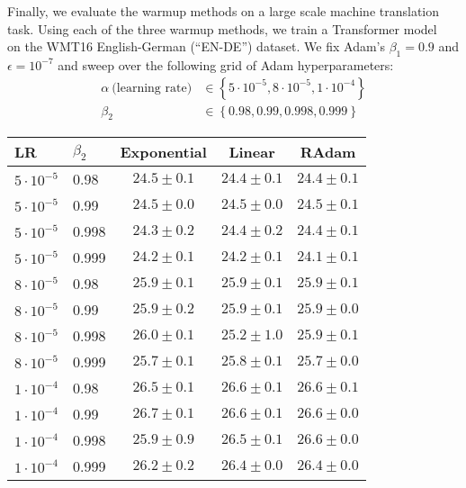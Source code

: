 {Finally, we evaluate the warmup methods on a large scale machine translation task. Using each of the three warmup methods, we train a Transformer model~\citep{vasmani2017transformer} on the WMT16 English-German (``EN-DE'') dataset. We fix Adam's $\beta_1=0.9$ and $\epsilon=10^{-7}$ and sweep over the following grid of Adam hyperparameters:
\begin{align*}
    \alpha~\text{(learning rate)} &\in \left\{ 5 \cdot {10}^{-5}, 8 \cdot {10}^{-5}, 1 \cdot {10}^{-4} \right\} \\
    \beta_2 &\in \left\{ 0.98, 0.99, 0.998, 0.999 \right\}
\end{align*}

\begin{table}[ht]
\centering

\captionsetup{
  justification=centering,
  margin=0.25in
}

\scriptsize

\setlength{\tabcolsep}{3pt}

\begin{tabular}{l l | c c c}
  \toprule
  
  \textbf{LR} & \textbf{$\beta_2$} &          \textbf{Exponential} &               \textbf{Linear} &                \textbf{RAdam} \\
  
  \midrule
  
$5 \cdot {10}^{-5}$ & 0.98& $ 24.5 \pm  0.1 $& $ 24.4 \pm  0.1 $& $ 24.4 \pm  0.1 $\\
$5 \cdot {10}^{-5}$ & 0.99& $ 24.5 \pm  0.0 $& $ 24.5 \pm  0.0 $& $ 24.5 \pm  0.1 $\\
$5 \cdot {10}^{-5}$ & 0.998& $ 24.3 \pm  0.2 $& $ 24.4 \pm  0.2 $& $ 24.4 \pm  0.1 $\\
$5 \cdot {10}^{-5}$ & 0.999& $ 24.2 \pm  0.1 $& $ 24.2 \pm  0.1 $& $ 24.1 \pm  0.1 $\\
$8 \cdot {10}^{-5}$ & 0.98& $ 25.9 \pm  0.1 $& $ 25.9 \pm  0.1 $& $ 25.9 \pm  0.1 $\\
$8 \cdot {10}^{-5}$ & 0.99& $ 25.9 \pm  0.2 $& $ 25.9 \pm  0.1 $& $ 25.9 \pm  0.0 $\\
$8 \cdot {10}^{-5}$ & 0.998& $ 26.0 \pm  0.1 $& $ 25.2 \pm  1.0 $& $ 25.9 \pm  0.1 $\\
$8 \cdot {10}^{-5}$ & 0.999& $ 25.7 \pm  0.1 $& $ 25.8 \pm  0.1 $& $ 25.7 \pm  0.0 $\\
$1 \cdot {10}^{-4}$ & 0.98& $ 26.5 \pm  0.1 $& $ 26.6 \pm  0.1 $& $ 26.6 \pm  0.1 $\\
$1 \cdot {10}^{-4}$ & 0.99& $ 26.7 \pm  0.1 $& $ 26.6 \pm  0.1 $& $ 26.6 \pm  0.0 $\\
$1 \cdot {10}^{-4}$ & 0.998& $ 25.9 \pm  0.9 $& $ 26.5 \pm  0.1 $& $ 26.6 \pm  0.0 $\\
$1 \cdot {10}^{-4}$ & 0.999& $ 26.2 \pm  0.2 $& $ 26.4 \pm  0.0 $& $ 26.4 \pm  0.0 $\\  
  \bottomrule
\end{tabular}


\end{table}}
